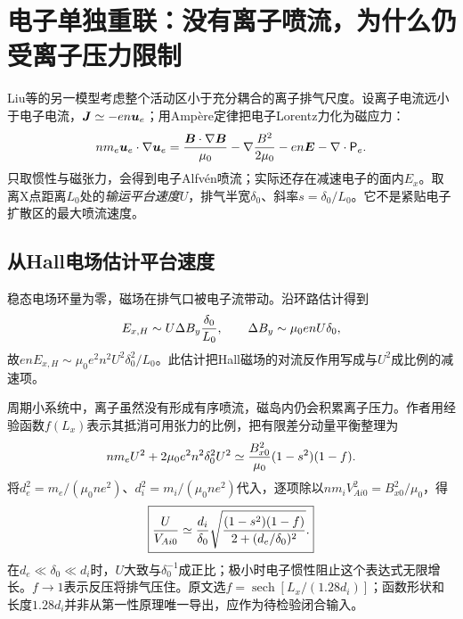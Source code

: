 \documentclass[UTF8,a4paper,11pt,openany,fontset=fandol]{ctexbook}
\begin{document}

\section{电子单独重联：没有离子喷流，为什么仍受离子压力限制}
\label{sec:remaining-erec}
Liu等的另一模型\citep{F741}考虑整个活动区小于充分耦合的离子排气尺度。设离子电流远小于电子电流，$\bm{J}\simeq-en\bm{u}_e$；用Ampère定律把电子Lorentz力化为磁应力：
\begin{equation}
 nm_e\bm{u}_e\cdot\nabla\bm{u}_e
 ={\bm{B}\cdot\nabla\bm{B}\over\mu_0}-\nabla{B^2\over2\mu_0}
 -en\bm{E}-\nabla\cdot\mathsf P_e.
\end{equation}
只取惯性与磁张力，会得到电子Alfvén喷流；实际还存在减速电子的面内$E_x$。取离X点距离$L_0$处的\emph{输运平台速度}$U$，排气半宽$\delta_0$、斜率$s=\delta_0/L_0$。它不是紧贴电子扩散区的最大喷流速度。

\subsection{从Hall电场估计平台速度}
稳态电场环量为零，磁场在排气口被电子流带动。沿环路估计得到
\begin{equation}
 E_{x,H}\sim U\Delta B_y{\delta_0\over L_0},\qquad
 \Delta B_y\sim\mu_0enU\delta_0,
\end{equation}
故$enE_{x,H}\sim\mu_0e^2n^2U^2\delta_0^2/L_0$。此估计把Hall磁场的对流反作用写成与$U^2$成比例的减速项。

周期小系统中，离子虽然没有形成有序喷流，磁岛内仍会积累离子压力。作者用经验函数$f(L_x)$表示其抵消可用张力的比例，把有限差分动量平衡整理为
\begin{equation}
 nm_eU^2+2\mu_0e^2n^2\delta_0^2U^2
 \simeq{B_{x0}^2\over\mu_0}(1-s^2)(1-f).
\end{equation}
将$d_e^2=m_e/(\mu_0ne^2)$、$d_i^2=m_i/(\mu_0ne^2)$代入，逐项除以$nm_iV_{Ai0}^2=B_{x0}^2/\mu_0$，得
\begin{equation}
 \boxed{{U\over V_{Ai0}}\simeq{d_i\over\delta_0}
 \sqrt{{(1-s^2)(1-f)\over2+(d_e/\delta_0)^2}}.}
 \label{eq:remaining-erec-speed}
\end{equation}
在$d_e\ll\delta_0\ll d_i$时，$U$大致与$\delta_0^{-1}$成正比；极小时电子惯性阻止这个表达式无限增长。$f\to1$表示反压将排气压住。原文选$f=\operatorname{sech}[L_x/(1.28d_i)]$；函数形状和长度$1.28d_i$并非从第一性原理唯一导出，应作为待检验闭合输入。
\end{document}
